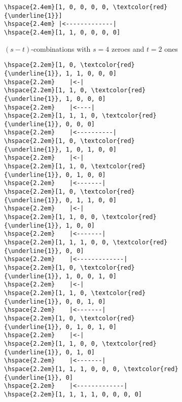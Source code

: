 \begin{figure}
\begin{center}
\begin{subfigure}[]{.34\textwidth}
\begin{center}
\begin{Verbatim}[commandchars=\\\{\}]
\hspace{2.4em}[1, 0, 0, 0, 0, \textcolor{red}{\underline{1}}]
\hspace{2.4em} |<-------------|
\hspace{2.4em}[1, 1, 0, 0, 0, 0]
\end{Verbatim}
            \end{center}
	    \caption{$(s-t)$-combinations with $s=4$ zeroes and $t=2$ ones}
            \label{subfig:coolcombo}
        \end{subfigure}
        \begin{subfigure}[]{.40\textwidth}
            \begin{center}
\begin{Verbatim}[commandchars=\\\{\}]
\hspace{2.2em}[1, 0, \textcolor{red}{\underline{1}}, 1, 1, 0, 0, 0]
\hspace{2.2em}    |<-|
\hspace{2.2em}[1, 1, 0, \textcolor{red}{\underline{1}}, 1, 0, 0, 0]
\hspace{2.2em}    |<----|
\hspace{2.2em}[1, 1, 1, 0, \textcolor{red}{\underline{1}}, 0, 0, 0]
\hspace{2.2em}    |<----------|
\hspace{2.2em}[1, 0, \textcolor{red}{\underline{1}}, 1, 0, 1, 0, 0]
\hspace{2.2em}    |<-|
\hspace{2.2em}[1, 1, 0, \textcolor{red}{\underline{1}}, 0, 1, 0, 0]
\hspace{2.2em}    |<-------|
\hspace{2.2em}[1, 0, \textcolor{red}{\underline{1}}, 0, 1, 1, 0, 0]
\hspace{2.2em}    |<-|
\hspace{2.2em}[1, 1, 0, 0, \textcolor{red}{\underline{1}}, 1, 0, 0]
\hspace{2.2em}    |<-------|
\hspace{2.2em}[1, 1, 1, 0, 0, \textcolor{red}{\underline{1}}, 0, 0]
\hspace{2.2em}    |<-------------|
\hspace{2.2em}[1, 0, \textcolor{red}{\underline{1}}, 1, 0, 0, 1, 0]
\hspace{2.2em}    |<-|
\hspace{2.2em}[1, 1, 0, \textcolor{red}{\underline{1}}, 0, 0, 1, 0]
\hspace{2.2em}    |<-------|
\hspace{2.2em}[1, 0, \textcolor{red}{\underline{1}}, 0, 1, 0, 1, 0]
\hspace{2.2em}    |<-|
\hspace{2.2em}[1, 1, 0, 0, \textcolor{red}{\underline{1}}, 0, 1, 0]
\hspace{2.2em}    |<-------|
\hspace{2.2em}[1, 1, 1, 0, 0, 0, \textcolor{red}{\underline{1}}, 0]
\hspace{2.2em}    |<-------------|
\hspace{2.2em}[1, 1, 1, 1, 0, 0, 0, 0]


\end{Verbatim}
\end{center}
\end{subfigure}
\end{center}
\end{figure}

